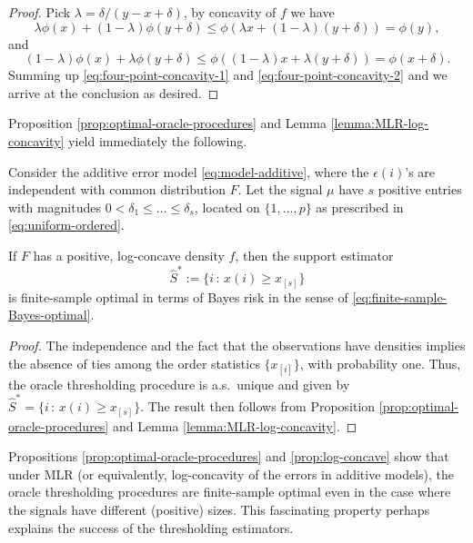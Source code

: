 \begin{proof}%
Pick $\lambda = \delta/(y-x+\delta)$, by concavity of $f$ we have
\begin{equation} \label{eq:four-point-concavity-1}
    \lambda \phi(x) + (1-\lambda) \phi(y+\delta) 
    \le \phi(\lambda x + (1-\lambda)(y+\delta)) 
    = \phi(y),
\end{equation}
and
\begin{equation} \label{eq:four-point-concavity-2}
    (1-\lambda) \phi(x) + \lambda \phi(y+\delta)
    \le \phi((1-\lambda) x + \lambda(y+\delta)) 
    = \phi(x+\delta).
\end{equation}
Summing up \eqref{eq:four-point-concavity-1} and \eqref{eq:four-point-concavity-2} and we arrive at the conclusion as desired.
\end{proof}

Proposition \ref{prop:optimal-oracle-procedures} and Lemma \ref{lemma:MLR-log-concavity} yield immediately the following.

\begin{proposition} \label{prop:log-concave}
Consider the additive error model \eqref{eq:model-additive}, where the $\epsilon(i)$'s are
independent with common distribution $F$.  Let the signal $\mu$ have $s$ positive entries with magnitudes $0<\delta_1\le\ldots\le\delta_s$, located on $\{1,\ldots,p\}$ as prescribed in \eqref{eq:uniform-ordered}.

If $F$ has a positive, log-concave density $f$, then the support estimator %
$$
 \widehat{S}^* := \{i\, :\, x(i)\ge x_{[s]}\}
$$ 
is  %
finite-sample optimal in terms of Bayes risk in the sense of \eqref{eq:finite-sample-Bayes-optimal}.
\end{proposition} 
\begin{proof} The independence and the fact that the observations have densities implies the absence of 
ties among the order statistics $\{x_{[i]}\}$, with probability one.  Thus, the oracle thresholding procedure is a.s.\ unique 
and given by $\widehat{S}^* = \{i\, :\, x(i)\ge x_{[s]}\}$.  The result then follows from 
Proposition \ref{prop:optimal-oracle-procedures} and Lemma \ref{lemma:MLR-log-concavity}.
\end{proof}

\begin{remark}
Propositions \ref{prop:optimal-oracle-procedures} and \ref{prop:log-concave} show that under MLR (or equivalently, 
log-concavity of the errors in additive models), the oracle thresholding procedures are finite-sample optimal even in the case where the signals have different (positive) sizes. This fascinating property perhaps 
explains the success of the thresholding estimators.
\end{remark}

